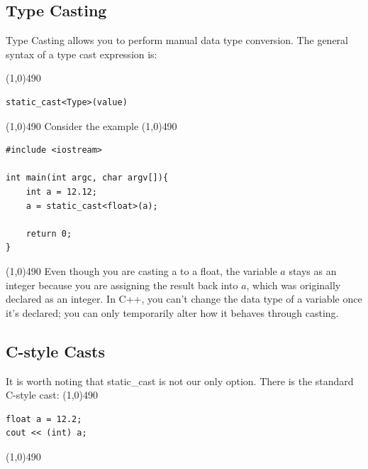 \documentclass{report}
\begin{document}
    \bigbreak \noindent 
    \subsection{Type Casting}
    \bigbreak \noindent 
    \begin{concept}
 Type Casting allows you to perform manual data type conversion. The general syntax of a type cast expression is:
	\end{concept}
    \bigbreak \noindent 
    \line(1,0){490}
    \begin{verbatim}
static_cast<Type>(value)
    \end{verbatim}
    \line(1,0){490}
    \bigbreak \noindent 
    Consider the example
    \smallbreak \noindent
    \line(1,0){490}
    \begin{verbatim}
#include <iostream>

int main(int argc, char argv[]){
    int a = 12.12;
    a = static_cast<float>(a);

    return 0;
}
    \end{verbatim}
    \line(1,0){490}
    \bigbreak \noindent 
    Even though you are casting a to a float, the variable $a$ stays as an integer because you are assigning the result back into $a$, which was originally declared as an integer. In C++, you can't change the data type of a variable once it's declared; you can only temporarily alter how it behaves through casting.

    \bigbreak \noindent 
    \subsection{C-style Casts}
    \bigbreak \noindent 
    It is worth noting that static\_cast is not our only option. There is the standard C-style cast:
    \bigbreak \noindent 
    \line(1,0){490}
    \begin{verbatim}
float a = 12.2;
cout << (int) a;
    \end{verbatim}
    \line(1,0){490}
    
\end{document}
